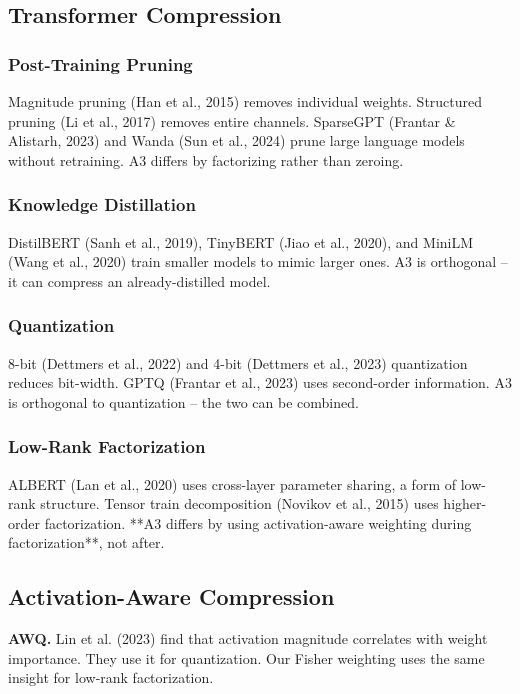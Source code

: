 \subsection{Transformer Compression}

\subsubsection{Post-Training Pruning}

Magnitude pruning (Han et al., 2015) removes individual weights. Structured 
pruning (Li et al., 2017) removes entire channels. SparseGPT (Frantar \& 
Alistarh, 2023) and Wanda (Sun et al., 2024) prune large language models 
without retraining. A3 differs by factorizing rather than zeroing.

\subsubsection{Knowledge Distillation}

DistilBERT (Sanh et al., 2019), TinyBERT (Jiao et al., 2020), and MiniLM 
(Wang et al., 2020) train smaller models to mimic larger ones. A3 is 
orthogonal -- it can compress an already-distilled model.

\subsubsection{Quantization}

8-bit (Dettmers et al., 2022) and 4-bit (Dettmers et al., 2023) quantization 
reduces bit-width. GPTQ (Frantar et al., 2023) uses second-order 
information. A3 is orthogonal to quantization -- the two can be combined.

\subsubsection{Low-Rank Factorization}

ALBERT (Lan et al., 2020) uses cross-layer parameter sharing, a form of 
low-rank structure. Tensor train decomposition (Novikov et al., 2015) uses 
higher-order factorization. **A3 differs by using activation-aware weighting 
during factorization**, not after.

\subsection{Activation-Aware Compression}

\textbf{AWQ.} Lin et al. (2023) find that activation magnitude correlates with 
weight importance. They use it for quantization. Our Fisher weighting uses the 
same insight for low-rank factorization.

